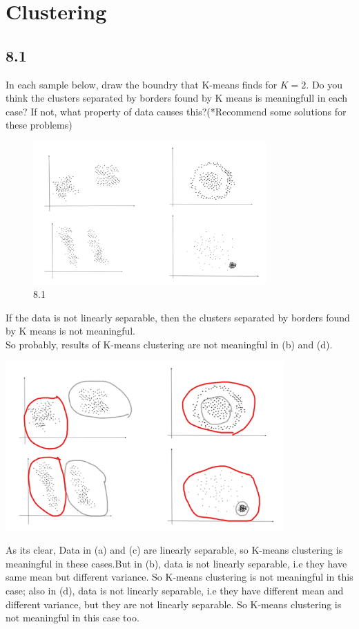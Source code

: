 \documentclass[12pt]{article}
\begin{document}
\section{Clustering}
\subsection{8.1}
In each sample below, draw the boundry that K-means finds for $K = 2$. Do you think the
clusters separated by borders found by K means is meaningfull in each case? If not, what
property of data causes this?(*Recommend some solutions for these problems)
\begin{figure}[h]
    \centering
    \includegraphics[width=0.8\textwidth]{Q8.png}
    \caption{8.1}
    \label{fig:8.1}
\end{figure}
\begin{qsolve}[Clustering]
    If the data is not linearly separable, then the clusters separated by borders found by K means is not meaningful.\\
    So probably, results of K-means clustering are not meaningful in (b) and (d).\\
    \begin{center}
        \includegraphics[width=0.8\textwidth]{Q8_solution.png}
    \end{center}
    As its clear, Data in (a) and (c) are linearly separable, so K-means clustering is meaningful in these cases.But in (b), data is not linearly separable, i.e they have same mean but different variance. So K-means clustering is not meaningful in this case; also in (d), data is not linearly separable, i.e they have different mean and different variance, but they are not linearly separable. So K-means clustering is not meaningful in this case too.\\
\end{qsolve}
\end{document}
